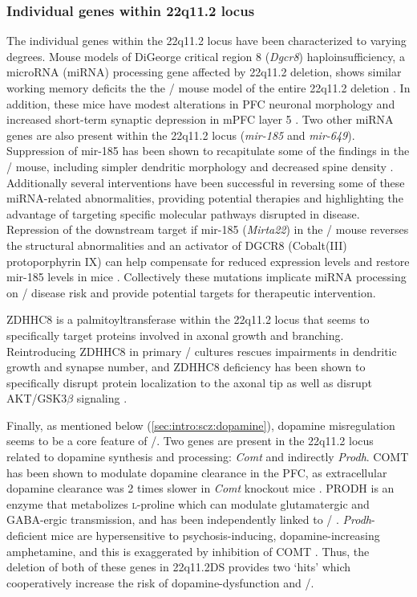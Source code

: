 \subsubsection{Individual genes within 22q11.2 locus}
The individual genes within the 22q11.2 locus have been characterized to varying degrees.
Mouse models of DiGeorge critical region 8 (\emph{Dgcr8}) haploinsufficiency, a microRNA (miRNA) processing gene affected by 22q11.2 deletion, shows similar working memory deficits the the \df/ mouse model of the entire 22q11.2 deletion \citep{Stark2008}.
In addition, these mice have modest alterations in \ac{PFC} neuronal morphology and increased short-term synaptic depression in mPFC layer 5 \citep{Fenelon2011}.
Two other miRNA genes are also present within the 22q11.2 locus (\emph{mir-185} and \emph{mir-649}).
Suppression of mir-185 has been shown to recapitulate some of the findings in the \df/ mouse, including simpler dendritic morphology and decreased spine density \citep{Xu2013a}.
Additionally several interventions have been successful in reversing some of these miRNA-related abnormalities, providing potential therapies and highlighting the advantage of targeting specific molecular pathways disrupted in disease.
Repression of the downstream target if mir-185 (\emph{Mirta22}) in the \df/ mouse reverses the structural abnormalities \citep{Xu2013a} and an activator of DGCR8 (Cobalt(III) protoporphyrin IX) can help compensate for reduced expression levels and restore mir-185 levels in mice \citep{Barr2015}.
Collectively these mutations implicate miRNA processing on \scz/ disease risk and provide potential targets for therapeutic intervention.

ZDHHC8 is a palmitoyltransferase within the 22q11.2 locus that seems to specifically target proteins involved in axonal growth and branching.
Reintroducing ZDHHC8 in primary \df/ cultures rescues impairments in dendritic growth and synapse number, and ZDHHC8 deficiency has been shown to specifically disrupt protein localization to the axonal tip as well as disrupt AKT/GSK3$\beta$ signaling \citep{Mukai2008, Mukai2015}.

Finally, as mentioned below (\autoref{sec:intro:scz:dopamine}), dopamine misregulation seems to be a core feature of \scz/.
Two genes are present in the 22q11.2 locus related to dopamine synthesis and processing: \emph{Comt} and indirectly \emph{Prodh}.
COMT has been shown to modulate dopamine clearance in the \ac{PFC}, as extracellular dopamine clearance was 2 times slower in \emph{Comt} knockout mice \citep{Kaenmaki2010}.
PRODH is an enzyme that metabolizes \textsc{l}-proline which can modulate glutamatergic and GABA-ergic transmission, and has been independently linked to \scz/ \citep{Liu2002, Crabtree2016}.
\emph{Prodh}-deficient mice are hypersensitive to psychosis-inducing, dopamine-increasing amphetamine, and this is exaggerated by inhibition of COMT \citep{Paterlini2005}. 
Thus, the deletion of both of these genes in 22q11.2DS provides two `hits' which cooperatively increase the risk of dopamine-dysfunction and \scz/.

